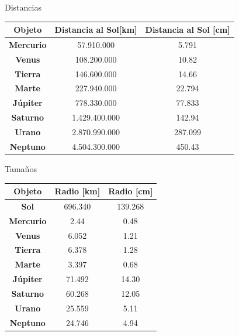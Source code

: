 \documentclass{beamer}
\begin{document}
\begin{frame}{Distancias}
\begin{table}[H]
\begin{tabular}{|c|c|c|}
\hline
\textbf{Objeto}   & \textbf{Distancia al Sol{[}km{]}}                                      & \textbf{Distancia al Sol  {[}cm{]}} \\ \hline
\textbf{Mercurio} &  57.910.000    & 5.791                   \\ \hline
\textbf{Venus}    & 108.200.000   & 10.82                   \\ \hline
\textbf{Tierra}   & 146.600.000  & 14.66                   \\ \hline
\textbf{Marte}    & 227.940.000    & 22.794                  \\ \hline
\textbf{Júpiter}  & 778.330.000   & 77.833                  \\ \hline
\textbf{Saturno}  & 1.429.400.000 & 142.94                  \\ \hline
\textbf{Urano}    & 2.870.990.000   & 287.099                 \\ \hline
\textbf{Neptuno}  & 4.504.300.000     & 450.43                  \\ \hline
\end{tabular}
\end{table}
\end{frame}

\begin{frame}{Tamaños}
\begin{table}[H]
\begin{tabular}{|c|c|c|}
\hline
\textbf{Objeto}   & \textbf{Radio {[}km{]}}                               & \textbf{Radio {[}cm{]}} \\ \hline
\textbf{Sol}      & 696.340                                               & 139.268                 \\ \hline
\textbf{Mercurio} &  2.44  & 0.48                    \\ \hline
\textbf{Venus}    & 6.052  & 1.21           \\ \hline
\textbf{Tierra}   & 6.378                                                 & 1.28                    \\ \hline
\textbf{Marte}    & 3.397   & 0.68                    \\ \hline
\textbf{Júpiter}  &  71.492 & 14.30            \\ \hline
\textbf{Saturno}  &60.268 & 12.05       \\ \hline
\textbf{Urano}    & 25.559                                                & 5.11                    \\ \hline
\textbf{Neptuno}  & 24.746                                                & 4.94                    \\ \hline
\end{tabular}
\end{table}
\end{frame}
\end{document}
